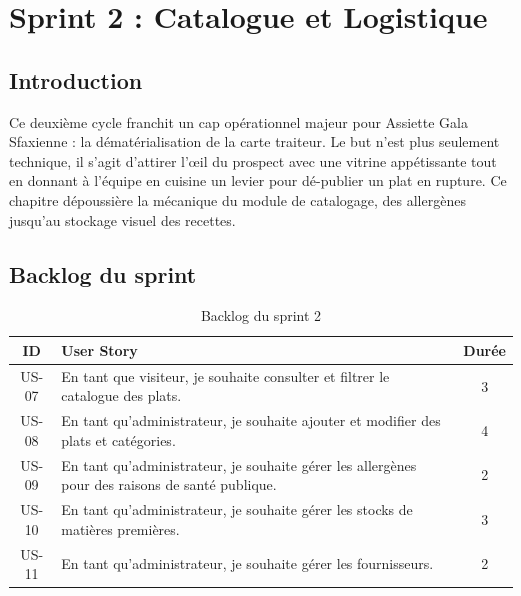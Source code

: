 ﻿%
\chapter{Sprint 2 : Catalogue et Logistique}

\section{Introduction}

Ce deuxième cycle franchit un cap opérationnel majeur pour Assiette Gala Sfaxienne : la dématérialisation de la carte traiteur. Le but n'est plus seulement technique, il s'agit d'attirer l'œil du prospect avec une vitrine appétissante tout en donnant à l'équipe en cuisine un levier pour dé-publier un plat en rupture. Ce chapitre dépoussière la mécanique du module de catalogage, des allergènes jusqu'au stockage visuel des recettes.

\section{Backlog du sprint}

\begin{table}[H]
    \centering
    \caption{Backlog du sprint 2}
    \label{tab:backlog_sprint2}
    \renewcommand{\arraystretch}{1.3}
    \begin{tabular}{|c|p{8cm}|c|}
        \hline
        \textbf{ID} & \textbf{User Story} & \textbf{Durée} \\
        \hline
        US-07 & En tant que visiteur, je souhaite consulter et filtrer le catalogue des plats. & 3 \\
        \hline
        US-08 & En tant qu'administrateur, je souhaite ajouter et modifier des plats et catégories. & 4 \\
        \hline
        US-09 & En tant qu'administrateur, je souhaite gérer les allergènes pour des raisons de santé publique. & 2 \\
        \hline
        US-10 & En tant qu'administrateur, je souhaite gérer les stocks de matières premières. & 3 \\
        \hline
        US-11 & En tant qu'administrateur, je souhaite gérer les fournisseurs. & 2 \\
        \hline
    \end{tabular}
\end{table}

